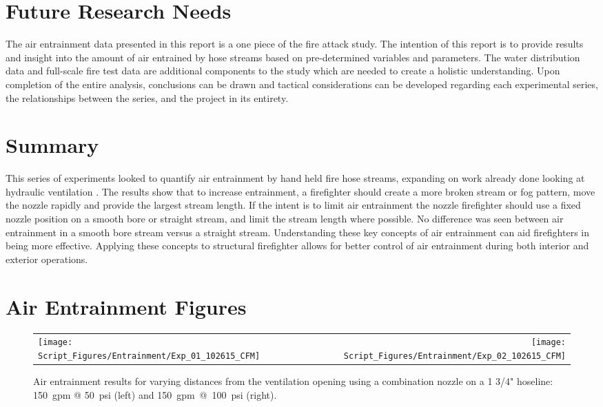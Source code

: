 \documentclass[12pt,oneside]{book}
\begin{document}
\chapter{Future Research Needs}

The air entrainment data presented in this report is a one piece of the fire attack study. The intention of this report is to provide results and insight into the amount of air entrained by hose streams based on pre-determined variables and parameters. The water distribution data and full-scale fire test data are additional components to the study which are needed to create a holistic understanding. Upon completion of the entire analysis, conclusions can be drawn and tactical considerations can be developed regarding each experimental series, the relationships between the series, and the project in its entirety.  

\chapter{Summary}

This series of experiments looked to quantify air entrainment by hand held fire hose streams, expanding on work already done looking at hydraulic ventilation \cite{KnappNozzles1,KnappNozzles2,KnappNozzles3,NISTHoseStreams}. The results show that to increase entrainment, a firefighter should create a more broken stream or fog pattern, move the nozzle rapidly and provide the largest stream length. If the intent is to limit air entrainment the nozzle firefighter should use a fixed nozzle position on a smooth bore or straight stream, and limit the stream length where possible.  No difference was seen between air entrainment in a smooth bore stream versus a straight stream. Understanding these key concepts of air entrainment can aid firefighters in being more effective. Applying these concepts to structural firefighter allows for better control of air entrainment during both interior and exterior operations. 



\clearpage

\appendix

\chapter{Air Entrainment Figures}
\label{app:Air_Entrainment_Figures}

\begin{figure}[!ht]
\begin{tabular*}{\textwidth}{lr}
\texttt{[image: Script\_Figures/Entrainment/Exp\_01\_102615\_CFM]} &
\texttt{[image: Script\_Figures/Entrainment/Exp\_02\_102615\_CFM]} \\
\end{tabular*}
\caption[Air Entrainment Results Varying Distances from the Ventilation Opening]{Air entrainment results for varying distances from the ventilation opening using a combination nozzle on a 1 3/4" hoseline: 150~gpm @ 50~psi (left) and 150~gpm~@~100~psi (right).}
\label{fig:Distance_Tests}
\end{figure}
\end{document}
